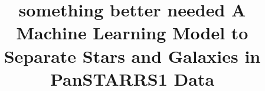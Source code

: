 \documentclass[twocolumn]{aastex62}
\begin{document}
\title{\textbf{something better needed} A Machine Learning Model to Separate Stars and Galaxies in PanSTARRS1 Data}


\end{document}
